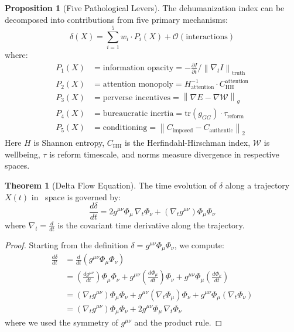 \documentclass[11pt,a4paper]{article}
\theoremstyle{definition}
\newtheorem{proposition}{Proposition}[section]
\newtheorem{theorem}{Theorem}[section]
\theoremstyle{remark}
\begin{document}
\begin{proposition}[Five Pathological Levers]
The dehumanization index can be decomposed into contributions from five primary mechanisms:
\[
\delta(X) = \sum_{i=1}^5 w_i \cdot P_i(X) + \mathcal{O}(\text{interactions})
\]
where:
\begin{align*}
P_1(X) &= \text{information opacity} = -\frac{\partial I}{\partial t} \Big/ \left\| \nabla_t I \right\|_{\text{truth}} \\
P_2(X) &= \text{attention monopoly} = H_{\text{attention}}^{-1} \cdot C_{\text{HH}}^{\text{attention}} \\
P_3(X) &= \text{perverse incentives} = \left\| \nabla E - \nabla \mathcal{W} \right\|_g \\
P_4(X) &= \text{bureaucratic inertia} = \text{tr}(g_{GG}) \cdot \tau_{\text{reform}} \\
P_5(X) &= \text{conditioning} = \left\| C_{\text{imposed}} - C_{\text{authentic}} \right\|_2
\end{align*}
Here $H$ is Shannon entropy, $C_{\text{HH}}$ is the Herfindahl-Hirschman index, $\mathcal{W}$ is wellbeing, $\tau$ is reform timescale, and norms measure divergence in respective spaces.
\end{proposition}

\begin{theorem}[Delta Flow Equation]
The time evolution of $\delta$ along a trajectory $X(t)$ in \SESES\ space is governed by:
\[
\frac{d\delta}{dt} = 2 g^{\mu\nu} \Phi_\mu \, \nabla_t \Phi_\nu + \left( \nabla_t g^{\mu\nu} \right) \Phi_\mu \Phi_\nu
\]
where $\nabla_t = \frac{d}{dt}$ is the covariant time derivative along the trajectory.
\end{theorem}

\begin{proof}
Starting from the definition $\delta = g^{\mu\nu} \Phi_\mu \Phi_\nu$, we compute:
\begin{align*}
\frac{d\delta}{dt} &= \frac{d}{dt}\left( g^{\mu\nu} \Phi_\mu \Phi_\nu \right) \\
&= \left( \frac{dg^{\mu\nu}}{dt} \right) \Phi_\mu \Phi_\nu + g^{\mu\nu} \left( \frac{d\Phi_\mu}{dt} \right) \Phi_\nu + g^{\mu\nu} \Phi_\mu \left( \frac{d\Phi_\nu}{dt} \right) \\
&= \left( \nabla_t g^{\mu\nu} \right) \Phi_\mu \Phi_\nu + g^{\mu\nu} (\nabla_t \Phi_\mu) \Phi_\nu + g^{\mu\nu} \Phi_\mu (\nabla_t \Phi_\nu) \\
&= \left( \nabla_t g^{\mu\nu} \right) \Phi_\mu \Phi_\nu + 2 g^{\mu\nu} \Phi_\mu \, \nabla_t \Phi_\nu
\end{align*}
where we used the symmetry of $g^{\mu\nu}$ and the product rule.
\end{proof}
\end{document}
